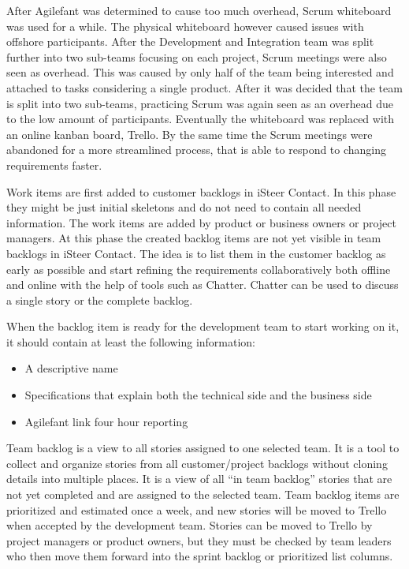 \documentclass[english]{tktltiki2}
\theoremstyle{definition}
\theoremstyle{remark}
\begin{document}
After Agilefant was determined to cause too much overhead, Scrum whiteboard was used for a while. The physical whiteboard however caused issues with offshore participants. After the Development and Integration team was split further into two sub-teams focusing on each project, Scrum meetings were also seen as overhead. This was caused by only half of the team being interested and attached to tasks considering a single product. After it was decided that the team is split into two sub-teams, practicing Scrum was again seen as an overhead due to the low amount of participants. Eventually the whiteboard was replaced with an online kanban board, Trello. By the same time the Scrum meetings were abandoned for a more streamlined process, that is able to respond to changing requirements faster. 

Work items are first added to customer backlogs in iSteer Contact. In this phase they might be just initial skeletons and do not need to contain all needed information. The work items are added by product or business owners or project managers. At this phase the created backlog items are not yet visible in team backlogs in iSteer Contact. The idea is to list them in the customer backlog as early as possible and start refining the requirements collaboratively both offline and online with the help of tools such as Chatter. Chatter can be used to discuss a single story or the complete backlog.

When the backlog item is ready for the development team to start working on it, it should contain at least the following information:
\begin{itemize}
\item  A descriptive name
\item  Specifications that explain both the technical side and the business side
\item  Agilefant link four hour reporting
\end{itemize}

Team backlog is a view to all stories assigned to one selected team. It is a tool to collect and organize stories from all customer/project backlogs without cloning details into multiple places. It is a view of all “in team backlog” stories that are not yet completed and are assigned to the selected team. Team backlog items are prioritized and estimated once a week, and new stories will be moved to Trello when accepted by the development team. Stories can be moved to Trello by project managers or product owners, but they must be checked by team leaders who then move them forward into the sprint backlog or prioritized list columns.
\end{document}
